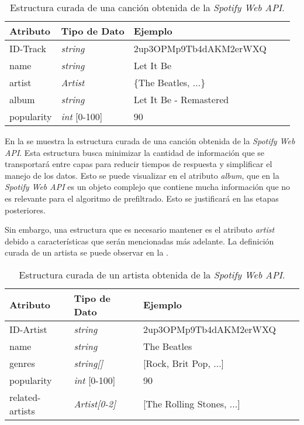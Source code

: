 \begin{table}[h!]
\centering
\begin{tabular}{l l l l l}
\toprule
Atributo & Tipo de Dato & Ejemplo \\
\midrule
ID-Track & \textit{string} & 2up3OPMp9Tb4dAKM2erWXQ \\
name & \textit{string} & Let It Be \\
artist & \textit{Artist} & \{The Beatles, ...\} \\
album & \textit{string} & Let It Be - Remastered \\
popularity & \textit{int} [0-100] & 90 \\

\bottomrule
\end{tabular}
\caption{Estructura curada de una canción obtenida de la \textit{Spotify Web API}.}
\label{tab:canciones_api}
\end{table}

En la  se muestra la estructura curada de una canción obtenida de la \textit{Spotify Web API}. Esta estructura busca minimizar la cantidad de información que se transportará entre capas para reducir tiempos de respuesta y simplificar el manejo de los datos. Esto se puede visualizar en el atributo \textit{album}, que en la \textit{Spotify Web API} es un objeto complejo que contiene mucha información que no es relevante para el algoritmo de prefiltrado. Esto se justificará en las etapas posteriores.

\newpage

Sin embargo, una estructura que es necesario mantener es el atributo \textit{artist} debido a características que serán mencionadas más adelante. La definición curada de un artista se puede observar en la .

\begin{table}[h!]
\centering
\begin{tabular}{l l l l l}
\toprule
Atributo & Tipo de Dato & Ejemplo \\
\midrule
ID-Artist & \textit{string} & 2up3OPMp9Tb4dAKM2erWXQ \\
name & \textit{string} & The Beatles \\
genres & \textit{string[]} & [Rock, Brit Pop, ...] \\
popularity & \textit{int} [0-100] & 90 \\
related-artists & \textit{Artist[0-2]} & [The Rolling Stones, ...] \\

\bottomrule
\end{tabular}
\caption{Estructura curada de un artista obtenida de la \textit{Spotify Web API}.}
\label{tab:artista_api}
\end{table}

